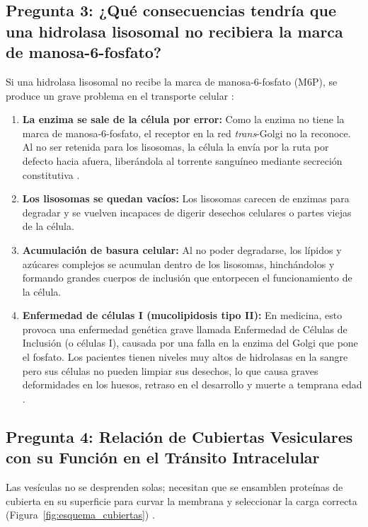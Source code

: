 \documentclass[12pt,spanish,letterpaper,oneside]{article}
\begin{document}
\subsection{Pregunta 3: ¿Qué consecuencias tendría que una hidrolasa lisosomal no recibiera la marca de manosa-6-fosfato?}
Si una hidrolasa lisosomal no recibe la marca de manosa-6-fosfato (M6P), se produce un grave problema en el transporte celular \parencite{lieberman2018marks, karp2019biologia}:
\begin{enumerate}
    \item \textbf{La enzima se sale de la célula por error:} Como la enzima no tiene la marca de manosa-6-fosfato, el receptor en la red \textit{trans}-Golgi no la reconoce. Al no ser retenida para los lisosomas, la célula la envía por la ruta por defecto hacia afuera, liberándola al torrente sanguíneo mediante secreción constitutiva \parencite{alberts2022molecular, lodish2021molecular}.
    \item \textbf{Los lisosomas se quedan vacíos:} Los lisosomas carecen de enzimas para degradar y se vuelven incapaces de digerir desechos celulares o partes viejas de la célula.
    \item \textbf{Acumulación de basura celular:} Al no poder degradarse, los lípidos y azúcares complejos se acumulan dentro de los lisosomas, hinchándolos y formando grandes cuerpos de inclusión que entorpecen el funcionamiento de la célula.
    \item \textbf{Enfermedad de células I (mucolipidosis tipo II):} En medicina, esto provoca una enfermedad genética grave llamada Enfermedad de Células de Inclusión (o células I), causada por una falla en la enzima del Golgi que pone el fosfato. Los pacientes tienen niveles muy altos de hidrolasas en la sangre pero sus células no pueden limpiar sus desechos, lo que causa graves deformidades en los huesos, retraso en el desarrollo y muerte a temprana edad \parencite{lieberman2018marks, kierszenbaum2020histologia}.
\end{enumerate}

\subsection{Pregunta 4: Relación de Cubiertas Vesiculares con su Función en el Tránsito Intracelular}
Las vesículas no se desprenden solas; necesitan que se ensamblen proteínas de cubierta en su superficie para curvar la membrana y seleccionar la carga correcta (Figura~\ref{fig:esquema_cubiertas}) \parencite{alberts2022molecular, lodish2021molecular}.
\end{document}

